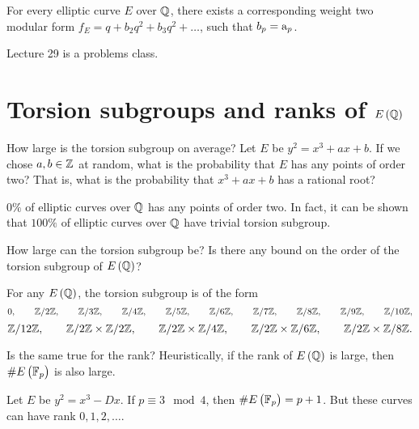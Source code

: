 \begin{theorem}
For every elliptic curve $ E $ over $ \mathbb{Q} $, there exists a corresponding weight two modular form $ f_E = q + b_2q^2 + b_3q^2 + \dots $, such that $ b_p = \mathrm{a}_p $.
\end{theorem}


Lecture 29 is a problems class.

\pagebreak

\section{Torsion subgroups and ranks of \texorpdfstring{$ E\br{\QQ} $}{E(Q)}}


How large is the torsion subgroup on average? Let $ E $ be $ y^2 = x^3 + ax + b $. If we chose $ a, b \in \mathbb{Z} $ at random, what is the probability that $ E $ has any points of order two? That is, what is the probability that $ x^3 + ax + b $ has a rational root?

\begin{proposition}
$ 0\% $ of elliptic curves over $ \mathbb{Q} $ has any points of order two. In fact, it can be shown that $ 100\% $ of elliptic curves over $ \mathbb{Q} $ have trivial torsion subgroup.
\end{proposition}

How large can the torsion subgroup be? Is there any bound on the order of the torsion subgroup of $ E\br{\QQ} $?

\begin{theorem}[Mazur 1977]
For any $ E\br{\QQ} $, the torsion subgroup is of the form
$$ 0, \qquad \mathbb{Z} / 2\mathbb{Z}, \qquad \mathbb{Z} / 3\mathbb{Z}, \qquad \mathbb{Z} / 4\mathbb{Z}, \qquad \mathbb{Z} / 5\mathbb{Z}, \qquad \mathbb{Z} / 6\mathbb{Z}, \qquad \mathbb{Z} / 7\mathbb{Z}, \qquad \mathbb{Z} / 8\mathbb{Z}, \qquad \mathbb{Z} / 9\mathbb{Z}, \qquad \mathbb{Z} / 10\mathbb{Z}, $$
$$ \mathbb{Z} / 12\mathbb{Z}, \qquad \mathbb{Z} / 2\mathbb{Z} \times \mathbb{Z} / 2\mathbb{Z}, \qquad \mathbb{Z} / 2\mathbb{Z} \times \mathbb{Z} / 4\mathbb{Z}, \qquad \mathbb{Z} / 2\mathbb{Z} \times \mathbb{Z} / 6\mathbb{Z}, \qquad \mathbb{Z} / 2\mathbb{Z} \times \mathbb{Z} / 8\mathbb{Z}. $$
\end{theorem}

Is the same true for the rank? Heuristically, if the rank of $ E\br{\QQ} $ is large, then $ \#E\br{\FF_p} $ is also large.

\begin{example}
Let $ E $ be $ y^2 = x^3 - Dx $. If $ p \equiv 3 \mod 4 $, then $ \#E\br{\FF_p} = p + 1 $. But these curves can have rank $ 0, 1, 2, \dots $.
\end{example}

